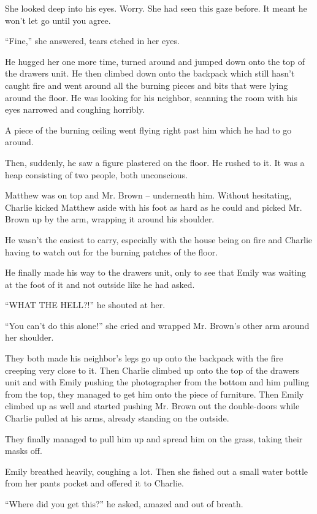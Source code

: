 She looked deep into his eyes. Worry. She had seen this gaze before. It meant he won't let go until you agree.

“Fine,” she answered, tears etched in her eyes.

He hugged her one more time, turned around and jumped down onto the top of the drawers unit. He then climbed down onto the backpack which still hasn't caught fire and went around all the burning pieces and bits that were lying around the floor. He was looking for his neighbor, scanning the room with his eyes narrowed and coughing horribly.

A piece of the burning ceiling went flying right past him which he had to go around.

Then, suddenly, he saw a figure plastered on the floor. He rushed to it. It was a heap consisting of two people, both unconscious.

Matthew was on top and Mr. Brown – underneath him. Without hesitating, Charlie kicked Matthew aside with his foot as hard as he could and picked Mr. Brown up by the arm, wrapping it around his shoulder.

He wasn't the easiest to carry, especially with the house being on fire and Charlie having to watch out for the burning patches of the floor.

He finally made his way to the drawers unit, only to see that Emily was waiting at the foot of it and not outside like he had asked.

“WHAT THE HELL?!” he shouted at her.

“You can't do this alone!” she cried and wrapped Mr. Brown's other arm around her shoulder.

They both made his neighbor's legs go up onto the backpack with the fire creeping very close to it. Then Charlie climbed up onto the top of the drawers unit and with Emily pushing the photographer from the bottom and him pulling from the top, they managed to get him onto the piece of furniture. Then Emily climbed up as well and started pushing Mr. Brown out the double-doors while Charlie pulled at his arms, already standing on the outside.

They finally managed to pull him up and spread him on the grass, taking their masks off.

Emily breathed heavily, coughing a lot. Then she fished out a small water bottle from her pants pocket and offered it to Charlie.

“Where did you get this?” he asked, amazed and out of breath.

